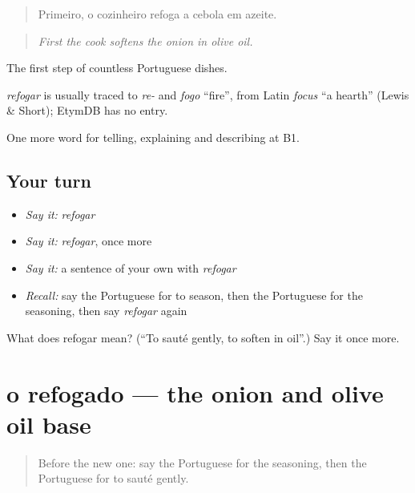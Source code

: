 \begin{quote}
Primeiro, o cozinheiro refoga a cebola em azeite.
\end{quote}

\begin{quote}
\emph{First the cook softens the onion in olive oil.}
\end{quote}

The first step of countless Portuguese dishes.

\begin{cousinweb}
\emph{refogar} is usually traced to \emph{re-} and \emph{fogo} \textquotedblleft{}fire\textquotedblright{}, from Latin \emph{focus} \textquotedblleft{}a hearth\textquotedblright{} (Lewis \& Short); EtymDB has no entry.
\end{cousinweb}

\begin{grammarlens}[title={What you've built}]
One more word for telling, explaining and describing at B1.
\end{grammarlens}

\subsection*{Your turn}
\begin{itemize}
\raggedright
  \item \emph{Say it:} \emph{refogar}
  \item \emph{Say it:} \emph{refogar}, once more
  \item \emph{Say it:} a sentence of your own with \emph{refogar}
  \item \emph{Recall:} say the Portuguese for to season, then the Portuguese for the seasoning, then say \emph{refogar} again
\end{itemize}

\begin{tcolorbox}[breakable,colback=teal!4,colframe=teal!35!black,title={Before you move on}]
What does refogar mean? (\textquotedblleft{}To sauté gently, to soften in oil\textquotedblright{}.) Say it once more.
\end{tcolorbox}
\section[o refogado]{o refogado — the onion and olive oil base}

\label{lesson:PT-C331-refogado}



\begin{quote}
Before the new one: say the Portuguese for the seasoning, then the Portuguese for to sauté gently.
\end{quote}

